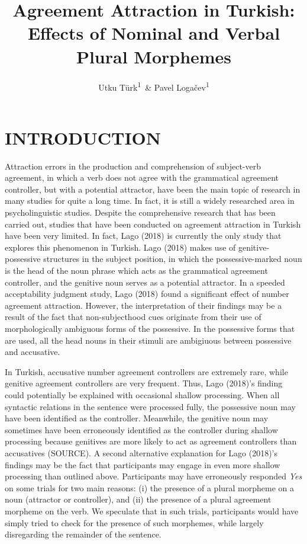\documentclass[doc]{apa6}
\title{Agreement Attraction in Turkish: Effects of Nominal and Verbal Plural
Morphemes}
\author{Utku Türk\textsuperscript{1}~\& Pavel Logačev\textsuperscript{1}}
\date{}
\begin{document}
\maketitle

\section{INTRODUCTION}\label{introduction}

Attraction errors in the production and comprehension of subject-verb
agreement, in which a verb does not agree with the grammatical agreement
controller, but with a potential attractor, have been the main topic of
research in many studies for quite a long time. In fact, it is still a
widely researched area in psycholinguistic studies. Despite the
comprehensive research that has been carried out, studies that have been
conducted on agreement attraction in Turkish have been very limited. In
fact, Lago (2018) is currently the only study that explores this
phenomenon in Turkish. Lago (2018) makes use of genitive-possessive
structures in the subject position, in which the possessive-marked noun
is the head of the noun phrase which acts as the grammatical agreement
controller, and the genitive noun serves as a potential attractor. In a
speeded acceptability judgment study, Lago (2018) found a significant
effect of number agreement attraction. However, the interpretation of
their findings may be a result of the fact that non-subjecthood cues
originate from their use of morphologically ambiguous forms of the
possessive. In the possessive forms that are used, all the head nouns in
their stimuli are ambigiuous between possessive and accusative.

In Turkish, accusative number agreement controllers are extremely rare,
while genitive agreement controllers are very frequent. Thus, Lago
(2018)'s finding could potentially be explained with occasional shallow
processing. When all syntactic relations in the sentence were processed
fully, the possessive noun may have been identified as the controller.
Meanwhile, the genitive noun may sometimes have been erroneously
identified as the controller during shallow processing because genitives
are more likely to act as agreement controllers than accusatives
(SOURCE). A second alternative explanation for Lago (2018)'s findings
may be the fact that participants may engage in even more shallow
processing than outlined above. Participants may have erroneously
responded \emph{Yes} on some trials for two main reasons: (i) the
presence of a plural morpheme on a noun (attractor or controller), and
(ii) the presence of a plural agreement morpheme on the verb. We
speculate that in such trials, participants would have simply tried to
check for the presence of such morphemes, while largely disregarding the
remainder of the sentence.
\end{document}
